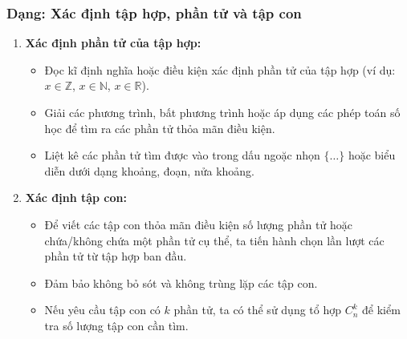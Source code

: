 \subsubsection{Dạng: Xác định tập hợp, phần tử và tập con}
\begin{phuongphap}
\begin{enumerate}
\item \textbf{Xác định phần tử của tập hợp:}
\begin{itemize}
    \item Đọc kĩ định nghĩa hoặc điều kiện xác định phần tử của tập hợp (ví dụ: $x \in \mathbb{Z}$, $x \in \mathbb{N}$, $x \in \mathbb{R}$).
    \item Giải các phương trình, bất phương trình hoặc áp dụng các phép toán số học để tìm ra các phần tử thỏa mãn điều kiện.
    \item Liệt kê các phần tử tìm được vào trong dấu ngoặc nhọn $\{\dots\}$ hoặc biểu diễn dưới dạng khoảng, đoạn, nửa khoảng.
\end{itemize}
\item \textbf{Xác định tập con:}
\begin{itemize}
    \item Để viết các tập con thỏa mãn điều kiện số lượng phần tử hoặc chứa/không chứa một phần tử cụ thể, ta tiến hành chọn lần lượt các phần tử từ tập hợp ban đầu.
    \item Đảm bảo không bỏ sót và không trùng lặp các tập con.
    \item Nếu yêu cầu tập con có $k$ phần tử, ta có thể sử dụng tổ hợp $C_n^k$ để kiểm tra số lượng tập con cần tìm.
\end{itemize}
\end{enumerate}
\end{phuongphap}

